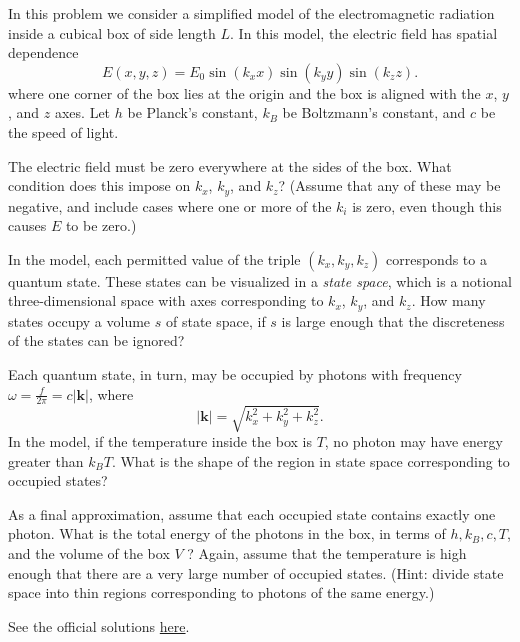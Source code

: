 \documentclass[11pt]{scrartcl}
\newcommand{\officialsol}[1]{See the official solutions \href{#1}{here}.}
\begin{document}
\begin{prob}[USAPhO 2011/A4]
    In this problem we consider a simplified model of the electromagnetic radiation inside a cubical
box of side length $L$. In this model, the electric field has spatial dependence
$$E(x, y, z) = E_0 \sin(k_xx) \sin(k_yy) \sin(k_zz).$$
where one corner of the box lies at the origin and the box is aligned with the $x$, $y$, and $z$ axes. Let $h$ be Planck’s constant, $k_B$ be Boltzmann’s constant, and $c$ be the speed of light.
\begin{anum}
    \item The electric field must be zero everywhere at the sides of the box. What condition does this
impose on $k_x$, $k_y$, and $k_z$? (Assume that any of these may be negative, and include cases
where one or more of the $k_i$
is zero, even though this causes $E$ to be zero.)
    \item In the model, each permitted value of the triple $(k_x, k_y, k_z)$ corresponds to a quantum state.
These states can be visualized in a \textit{state space}, which is a notional three-dimensional space
with axes corresponding to $k_x$, $k_y$, and $k_z$. How many states occupy a volume $s$ of state space,
if $s$ is large enough that the discreteness of the states can be ignored?
\item Each quantum state, in turn, may be occupied by photons with frequency $\omega = \frac f{2\pi} = c|\mathbf k |$, where
$$|\mathbf k| = \sqrt{k_x^2 + k_y^2+k_z^2}.$$
In the model, if the temperature inside the box is $T$, no photon may have energy greater than $k_BT$. What is the shape of the region in state space corresponding to occupied states?
\item As a final approximation, assume that each occupied state contains exactly one photon. What
is the total energy of the photons in the box, in terms of $h, k_B, c, T$, and the volume of the box
$V$ ? Again, assume that the temperature is high enough that there are a very large number of
occupied states. (Hint: divide state space into thin regions corresponding to photons of the
same energy.)
\end{anum}
\end{prob}
\begin{sol}
    \officialsol{https://aapt.org/Common/upload/USAPhO-2011-Solutions_rev-4012021.pdf}
\end{sol}
\end{document}
